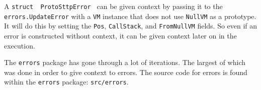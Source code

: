 A \texttt{struct { ProtoSttpError }} can be given context by passing it to the \verb|errors.UpdateError| with a \verb|VM| instance that does not use \verb|NullVM| as a prototype. It will do this by setting the \verb|Pos|, \verb|CallStack|, and \verb|FromNullVM| fields. So even if an error is constructed without context, it can be given context later on in the execution.

The \verb|errors| package has gone through a lot of iterations. The largest of which was done in order to give context to errors. The source code for errors is found within the \verb|errors| package: \verb|src/errors|.
